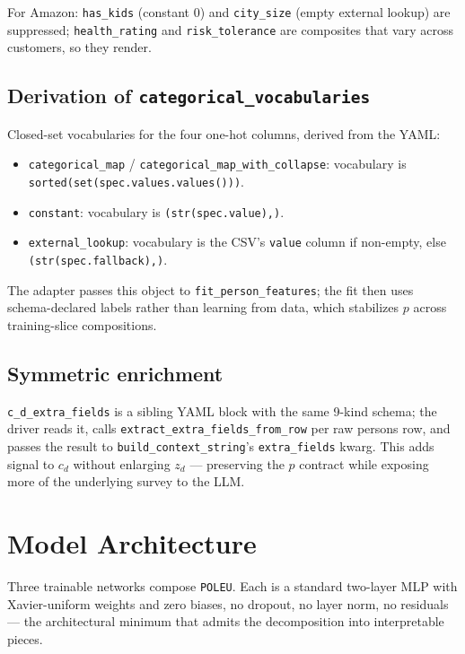 \documentclass[11pt,a4paper]{article}
\begin{document}
For Amazon: \texttt{has\_kids} (constant 0) and \texttt{city\_size}
(empty external lookup) are suppressed; \texttt{health\_rating} and
\texttt{risk\_tolerance} are composites that vary across customers,
so they render.

\subsection{Derivation of \texttt{categorical\_vocabularies}}

Closed-set vocabularies for the four one-hot columns, derived from the
YAML:

\begin{itemize}
\item \texttt{categorical\_map} / \texttt{categorical\_map\_with\_collapse}:
vocabulary is \texttt{sorted(set(spec.values.values()))}.
\item \texttt{constant}: vocabulary is \texttt{(str(spec.value),)}.
\item \texttt{external\_lookup}: vocabulary is the CSV's \texttt{value}
column if non-empty, else \texttt{(str(spec.fallback),)}.
\end{itemize}

The adapter passes this object to \texttt{fit\_person\_features}; the
fit then uses schema-declared labels rather than learning from data,
which stabilizes $p$ across training-slice compositions.

\subsection{Symmetric enrichment}

\texttt{c\_d\_extra\_fields} is a sibling YAML block with the same
9-kind schema; the driver reads it, calls
\texttt{extract\_extra\_fields\_from\_row} per raw persons row, and
passes the result to \texttt{build\_context\_string}'s
\texttt{extra\_fields} kwarg. This adds signal to $c_d$ without
enlarging $z_d$ — preserving the $p$ contract while exposing more of
the underlying survey to the LLM.

\section{Model Architecture}
\label{sec:model}

Three trainable networks compose \texttt{POLEU}. Each is a standard
two-layer MLP with Xavier-uniform weights and zero biases, no dropout,
no layer norm, no residuals — the architectural minimum that admits
the decomposition into interpretable pieces.
\end{document}
